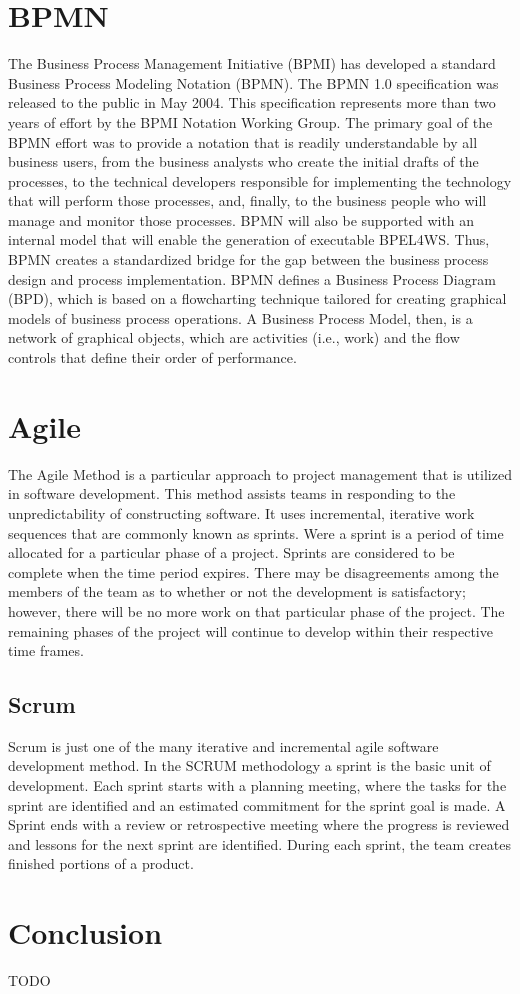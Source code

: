 \section{BPMN}
The Business Process Management Initiative (BPMI) has developed a standard
Business Process Modeling Notation (BPMN). The BPMN 1.0 specification was
released to the public in May 2004. This specification represents more than two
years of effort by the BPMI Notation Working Group. The primary goal of the BPMN
effort was to provide a notation that is readily understandable by all business
users, from the business analysts who create the initial drafts of the
processes, to the technical developers responsible for implementing the
technology that will perform those processes, and, finally, to the business
people who will manage and monitor those processes. BPMN will also be supported
with an internal model that will enable the generation of executable BPEL4WS.
Thus, BPMN creates a standardized bridge for the gap between the business
process design and process implementation.
BPMN defines a Business Process Diagram (BPD), which is based on a flowcharting
technique tailored for creating graphical models of business process operations.
A Business Process Model, then, is a network of graphical objects, which are
activities (i.e., work) and the flow controls that define their order of
performance.


\section{Agile}
The Agile Method is a particular approach to project management that is utilized
in software development. This method assists teams in responding to the
unpredictability of constructing software. It uses incremental, iterative work
sequences that are commonly known as sprints. Were a sprint is a period of time
allocated for a particular phase of a project. Sprints are considered to be
complete when the time period expires. There may be disagreements among the
members of the team as to whether or not the development is satisfactory;
however, there will be no more work on that particular phase of the project. The
remaining phases of the project will continue to develop within their respective
time frames.
\subsection{Scrum}
Scrum is just one of the many iterative and incremental agile software
development method. In the SCRUM methodology a sprint is the basic unit of
development. Each sprint starts with a planning meeting, where the tasks for the
sprint are identified and an estimated commitment for the sprint goal is made. A
Sprint ends with a review or retrospective meeting where the progress is
reviewed and lessons for the next sprint are identified. During each sprint, the
team creates finished portions of a product.

\section*{Conclusion}
TODO
